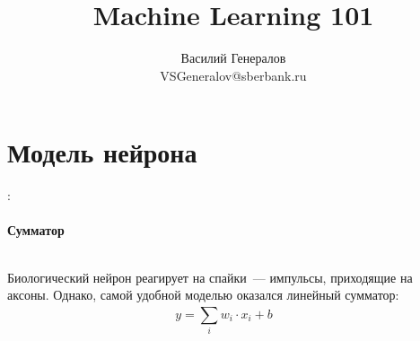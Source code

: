 \documentclass{beamer}
\author{Василий Генералов \\ VSGeneralov@sberbank.ru}
\title{Machine Learning 101}
\begin{document}
\begin{frame}
  \maketitle
\end{frame}

\begin{frame}
  \tableofcontents
\end{frame}

\section{Модель нейрона}

\begin{frame}{\secname : \subsecname}
  \framesubtitle{Сумматор}
  \begin{columns}

    \begin{column}{0.5\textwidth}
      Биологический нейрон реагирует на спайки~--- импульсы,
      приходящие на аксоны. Однако, самой удобной моделью оказался
      линейный сумматор:
      $$ y = \sum_{i}^{} w_i \cdot x_i + b $$
    \end{column}

    \begin{column}{0.5\textwidth}
      \begin{center}
      \end{center}
    \end{column}

  \end{columns}
\end{frame}
\end{document}
